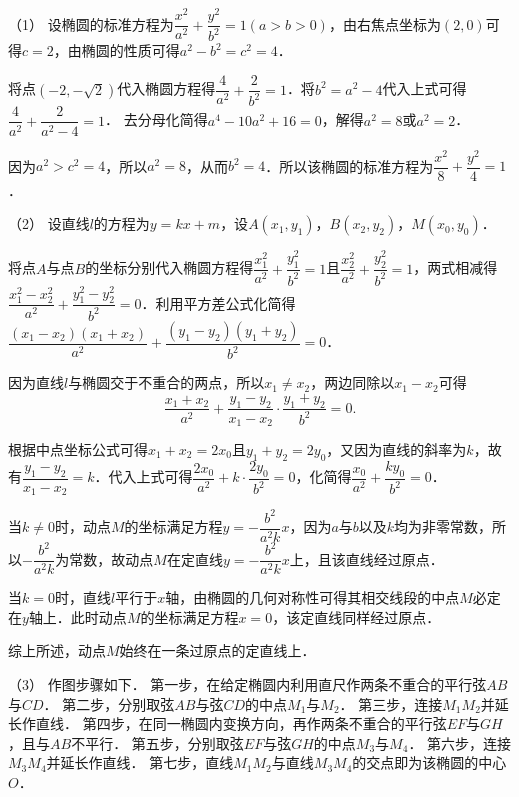 \begin{solutions}
（1）  
设椭圆的标准方程为$\dfrac{x^{2}}{a^{2}}+\dfrac{y^{2}}{b^{2}}=1(a>b>0)$，由右焦点坐标为$(2,0)$可得$c=2$，由椭圆的性质可得$a^{2}-b^{2}=c^{2}=4$．  

将点$(-2,-\sqrt{2})$代入椭圆方程得$\dfrac{4}{a^{2}}+\dfrac{2}{b^{2}}=1$．将$b^{2}=a^{2}-4$代入上式可得$\dfrac{4}{a^{2}}+\dfrac{2}{a^{2}-4}=1$．  
去分母化简得$a^{4}-10a^{2}+16=0$，解得$a^{2}=8$或$a^{2}=2$．  

因为$a^{2}>c^{2}=4$，所以$a^{2}=8$，从而$b^{2}=4$．所以该椭圆的标准方程为$\dfrac{x^{2}}{8}+\dfrac{y^{2}}{4}=1$．  

（2）  
设直线$l$的方程为$y=kx+m$，设$A(x_{1},y_{1})$，$B(x_{2},y_{2})$，$M(x_{0},y_{0})$．  

将点$A$与点$B$的坐标分别代入椭圆方程得$\dfrac{x_{1}^{2}}{a^{2}}+\dfrac{y_{1}^{2}}{b^{2}}=1$且$\dfrac{x_{2}^{2}}{a^{2}}+\dfrac{y_{2}^{2}}{b^{2}}=1$，两式相减得$\dfrac{x_{1}^{2}-x_{2}^{2}}{a^{2}}+\dfrac{y_{1}^{2}-y_{2}^{2}}{b^{2}}=0$．利用平方差公式化简得$\dfrac{(x_{1}-x_{2})(x_{1}+x_{2})}{a^{2}}+\dfrac{(y_{1}-y_{2})(y_{1}+y_{2})}{b^{2}}=0$．  

因为直线$l$与椭圆交于不重合的两点，所以$x_{1}\neq x_{2}$，两边同除以$x_{1}-x_{2}$可得  
$$
\dfrac{x_{1}+x_{2}}{a^{2}}+\dfrac{y_{1}-y_{2}}{x_{1}-x_{2}}\cdot\dfrac{y_{1}+y_{2}}{b^{2}}=0.
$$  

根据中点坐标公式可得$x_{1}+x_{2}=2x_{0}$且$y_{1}+y_{2}=2y_{0}$，又因为直线的斜率为$k$，故有$\dfrac{y_{1}-y_{2}}{x_{1}-x_{2}}=k$．代入上式可得$\dfrac{2x_{0}}{a^{2}}+k\cdot\dfrac{2y_{0}}{b^{2}}=0$，化简得$\dfrac{x_{0}}{a^{2}}+\dfrac{ky_{0}}{b^{2}}=0$．  

当$k\neq0$时，动点$M$的坐标满足方程$y=-\dfrac{b^{2}}{a^{2}k}x$，因为$a$与$b$以及$k$均为非零常数，所以$-\dfrac{b^{2}}{a^{2}k}$为常数，故动点$M$在定直线$y=-\dfrac{b^{2}}{a^{2}k}x$上，且该直线经过原点．  

当$k=0$时，直线$l$平行于$x$轴，由椭圆的几何对称性可得其相交线段的中点$M$必定在$y$轴上．此时动点$M$的坐标满足方程$x=0$，该定直线同样经过原点．  

综上所述，动点$M$始终在一条过原点的定直线上．  

（3）  
作图步骤如下．  
第一步，在给定椭圆内利用直尺作两条不重合的平行弦$AB$与$CD$．  
第二步，分别取弦$AB$与弦$CD$的中点$M_{1}$与$M_{2}$．  
第三步，连接$M_{1}M_{2}$并延长作直线．  
第四步，在同一椭圆内变换方向，再作两条不重合的平行弦$EF$与$GH$，且与$AB$不平行．  
第五步，分别取弦$EF$与弦$GH$的中点$M_{3}$与$M_{4}$．  
第六步，连接$M_{3}M_{4}$并延长作直线．  
第七步，直线$M_{1}M_{2}$与直线$M_{3}M_{4}$的交点即为该椭圆的中心$O$．


\end{solutions}
